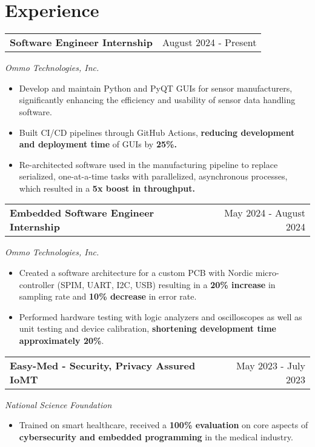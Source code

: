 \documentclass[a4paper,12pt]{article}
\begin{document}
\section{Experience}

\begin{tabularx}{\linewidth}{@{}Xr@{}}
\textbf{Software Engineer Internship} & \hfill August 2024 - Present
\end{tabularx}
\textit{Ommo Technologies, Inc.}
\vspace{-0.4em}
\begin{itemize}
    \item Develop and maintain Python and PyQT GUIs for sensor manufacturers, significantly enhancing the efficiency and usability of sensor data handling software.
    \item Built CI/CD pipelines through GitHub Actions, \textbf{reducing development and deployment time} of GUIs by \textbf{25\%.}
    \item Re-architected software used in the manufacturing pipeline to replace serialized, one-at-a-time tasks with parallelized, asynchronous processes, which resulted in a \textbf{5x boost in throughput.}
\end{itemize}

\begin{tabularx}{\linewidth}{@{}Xr@{}}
\textbf{Embedded Software Engineer Internship} & \hfill May 2024 - August 2024
\end{tabularx}
\textit{Ommo Technologies, Inc.}
\vspace{-0.4em}
\begin{itemize}   
    \item Created a software architecture for a custom PCB with Nordic micro-controller (SPIM, UART, I2C, USB) resulting in a \textbf{20\% increase} in sampling rate and \textbf{10\% decrease} in error rate.
    \item Performed hardware testing with logic analyzers and oscilloscopes as well as unit testing and device calibration, \textbf{shortening development time approximately 20\%}.
\end{itemize}

\begin{tabularx}{\linewidth}{@{}Xr@{}}
\textbf{Easy-Med - Security, Privacy Assured IoMT} & \hfill May 2023 - July 2023
\end{tabularx}
\textit{National Science Foundation}
\vspace{-0.4em}
\begin{itemize}
    \item Trained on smart healthcare, received a \textbf{100\% evaluation} on core aspects of \textbf{cybersecurity and embedded programming} in the medical industry.
\end{itemize}
\end{document}
